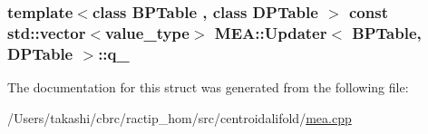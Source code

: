 \hypertarget{struct_m_e_a_1_1_updater_a06a1f82c408b0c63fb2e56f1fffa4cea}{
\subsubsection[{q\+\_\+}]{\setlength{\rightskip}{0pt plus 5cm}template$<$class B\+P\+Table , class D\+P\+Table $>$ const std\+::vector$<${\bf value\+\_\+type}$>$ {\bf M\+E\+A\+::\+Updater}$<$ {\bf B\+P\+Table}, D\+P\+Table $>$\+::q\+\_\+}}\label{struct_m_e_a_1_1_updater_a06a1f82c408b0c63fb2e56f1fffa4cea}


The documentation for this struct was generated from the following file\+:\begin{DoxyCompactItemize}
\item 
/\+Users/takashi/cbrc/ractip\+\_\+hom/src/centroidalifold/\hyperlink{mea_8cpp}{mea.\+cpp}\end{DoxyCompactItemize}
